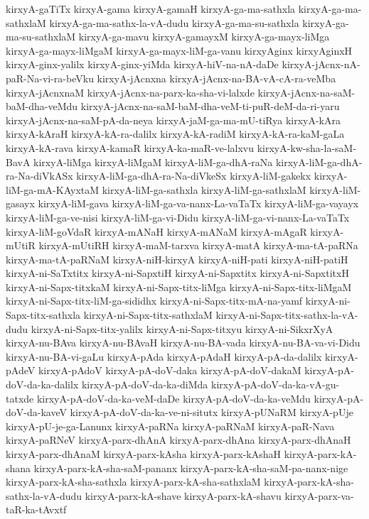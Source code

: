 {kirxyA-gaTiTx
kirxyA-gama
kirxyA-gamaH
kirxyA-ga-ma-sathxla
kirxyA-ga-ma-sathxlaM
kirxyA-ga-ma-sathx-la-vA-dudu
kirxyA-ga-ma-su-sathxla
kirxyA-ga-ma-su-sathxlaM
kirxyA-ga-mavu
kirxyA-gamayxM
kirxyA-ga-mayx-liMga
kirxyA-ga-mayx-liMgaM
kirxyA-ga-mayx-liM-ga-vanu
kirxyAginx
kirxyAginxH
kirxyA-ginx-yalilx
kirxyA-ginx-yiMda
kirxyA-hiV-na-nA-daDe
kirxyA-jAcnx-nA-paR-Na-vi-ra-beVku
kirxyA-jAcnxna
kirxyA-jAcnx-na-BA-vA-cA-ra-veMba
kirxyA-jAcnxnaM
kirxyA-jAcnx-na-parx-ka-sha-vi-lalxde
kirxyA-jAcnx-na-saM-baM-dha-veMdu
kirxyA-jAcnx-na-saM-baM-dha-veM-ti-puR-deM-da-ri-yaru
kirxyA-jAcnx-na-saM-pA-da-neya
kirxyA-jaM-ga-ma-mU-tiRya
kirxyA-kAra
kirxyA-kAraH
kirxyA-kA-ra-dalilx
kirxyA-kA-radiM
kirxyA-kA-ra-kaM-gaLa
kirxyA-kA-rava
kirxyA-kamaR
kirxyA-ka-maR-ve-lalxvu
kirxyA-kw-sha-la-saM-BavA
kirxyA-liMga
kirxyA-liMgaM
kirxyA-liM-ga-dhA-raNa
kirxyA-liM-ga-dhA-ra-Na-diVkASx
kirxyA-liM-ga-dhA-ra-Na-diVkeSx
kirxyA-liM-gakekx
kirxyA-liM-ga-mA-KAyxtaM
kirxyA-liM-ga-sathxla
kirxyA-liM-ga-sathxlaM
kirxyA-liM-gasayx
kirxyA-liM-gava
kirxyA-liM-ga-va-nanx-La-vaTaTx
kirxyA-liM-ga-vayayx
kirxyA-liM-ga-ve-nisi
kirxyA-liM-ga-vi-Didu
kirxyA-liM-ga-vi-nanx-La-vaTaTx
kirxyA-liM-goVdaR
kirxyA-mANaH
kirxyA-mANaM
kirxyA-mAgaR
kirxyA-mUtiR
kirxyA-mUtiRH
kirxyA-maM-tarxva
kirxyA-matA
kirxyA-ma-tA-paRNa
kirxyA-ma-tA-paRNaM
kirxyA-niH-kirxyA
kirxyA-niH-pati
kirxyA-niH-patiH
kirxyA-ni-SaTxtitx
kirxyA-ni-SapxtiH
kirxyA-ni-Sapxtitx
kirxyA-ni-SapxtitxH
kirxyA-ni-Sapx-titxkaM
kirxyA-ni-Sapx-titx-liMga
kirxyA-ni-Sapx-titx-liMgaM
kirxyA-ni-Sapx-titx-liM-ga-sididhx
kirxyA-ni-Sapx-titx-mA-na-yamf
kirxyA-ni-Sapx-titx-sathxla
kirxyA-ni-Sapx-titx-sathxlaM
kirxyA-ni-Sapx-titx-sathx-la-vA-dudu
kirxyA-ni-Sapx-titx-yalilx
kirxyA-ni-Sapx-titxyu
kirxyA-ni-SikxrXyA
kirxyA-nu-BAva
kirxyA-nu-BAvaH
kirxyA-nu-BA-vada
kirxyA-nu-BA-va-vi-Didu
kirxyA-nu-BA-vi-gaLu
kirxyA-pAda
kirxyA-pAdaH
kirxyA-pA-da-dalilx
kirxyA-pAdeV
kirxyA-pAdoV
kirxyA-pA-doV-daka
kirxyA-pA-doV-dakaM
kirxyA-pA-doV-da-ka-dalilx
kirxyA-pA-doV-da-ka-diMda
kirxyA-pA-doV-da-ka-vA-gu-tatxde
kirxyA-pA-doV-da-ka-veM-daDe
kirxyA-pA-doV-da-ka-veMdu
kirxyA-pA-doV-da-kaveV
kirxyA-pA-doV-da-ka-ve-ni-situtx
kirxyA-pUNaRM
kirxyA-pUje
kirxyA-pU-je-ga-Lanunx
kirxyA-paRNa
kirxyA-paRNaM
kirxyA-paR-Nava
kirxyA-paRNeV
kirxyA-parx-dhAnA
kirxyA-parx-dhAna
kirxyA-parx-dhAnaH
kirxyA-parx-dhAnaM
kirxyA-parx-kAsha
kirxyA-parx-kAshaH
kirxyA-parx-kA-shana
kirxyA-parx-kA-sha-saM-pananx
kirxyA-parx-kA-sha-saM-pa-nanx-nige
kirxyA-parx-kA-sha-sathxla
kirxyA-parx-kA-sha-sathxlaM
kirxyA-parx-kA-sha-sathx-la-vA-dudu
kirxyA-parx-kA-shave
kirxyA-parx-kA-shavu
kirxyA-parx-va-taR-ka-tAvxtf
}
